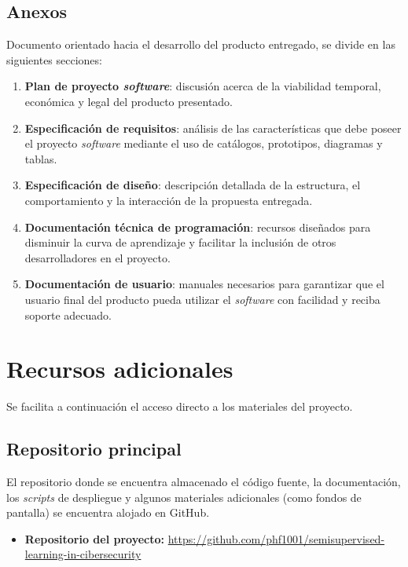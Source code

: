 \subsection{Anexos}

Documento orientado hacia el desarrollo del producto entregado, se divide en las siguientes secciones:

\begin{enumerate}
	\item \textbf{Plan de proyecto \textit{software}}: discusión acerca de la viabilidad temporal, económica y legal del producto presentado.
	\item \textbf{Especificación de requisitos}: análisis de las características que debe poseer el proyecto \textit{software} mediante el uso de catálogos, prototipos, diagramas y tablas.
	\item \textbf{Especificación de diseño}: descripción detallada de la estructura,
	el comportamiento y la interacción de la propuesta entregada.
	\item \textbf{Documentación técnica de programación}: recursos diseñados para disminuir la curva de aprendizaje y facilitar la inclusión de otros desarrolladores en el proyecto.
	\item \textbf{Documentación de usuario}: manuales necesarios para garantizar que el usuario final del producto pueda utilizar el \textit{software} con facilidad y reciba soporte adecuado.
\end{enumerate} 

\section{Recursos adicionales}
\label{s:recursos}
Se facilita a continuación el acceso directo a los materiales del proyecto.

\subsection{Repositorio principal}

El repositorio donde se encuentra almacenado el código fuente, la documentación, los \textit{scripts} de despliegue y algunos materiales adicionales (como fondos de pantalla) se encuentra alojado en GitHub.

\begin{itemize}
	\item \textbf{Repositorio del proyecto:}
	\url{https://github.com/phf1001/semisupervised-learning-in-cibersecurity}
\end{itemize}


